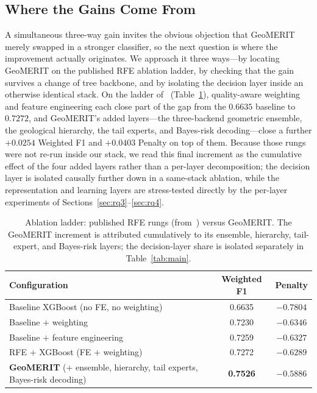\documentclass[bdcc,article,submit,pdftex,moreauthors]{Definitions/mdpi}
\begin{document}
\subsection{Where the Gains Come From}
\label{sec:rq2}
A simultaneous three-way gain invites the obvious objection that GeoMERIT merely swapped in a
stronger classifier, so the next question is where the improvement actually originates. We
approach it three ways---by locating GeoMERIT on the published RFE ablation ladder, by checking
that the gain survives a change of tree backbone, and by isolating the decision layer inside an
otherwise identical stack. On the ladder of~\cite{chen2026rfe} (Table~\ref{tab:ladder}),
quality-aware weighting and feature engineering each close part of the gap from the $0.6635$
baseline to $0.7272$, and GeoMERIT's added layers---the three-backend geometric ensemble, the
geological hierarchy, the tail experts, and Bayes-risk decoding---close a further $+0.0254$
Weighted F1 and $+0.0403$ Penalty on top of them. Because those rungs were not re-run inside
our stack, we read this final increment as the cumulative effect of the four added layers
rather than a per-layer decomposition; the decision layer is isolated causally further down in
a same-stack ablation, while the representation and learning layers are stress-tested directly
by the per-layer experiments of Sections~\ref{sec:rq3}--\ref{sec:rq4}.

\begin{table}[H]
\caption{Ablation ladder: published RFE rungs (from~\cite{chen2026rfe}) versus GeoMERIT. The
GeoMERIT increment is attributed cumulatively to its ensemble, hierarchy, tail-expert, and
Bayes-risk layers; the decision-layer share is isolated separately in
Table~\ref{tab:main}.\label{tab:ladder}}
\begin{tabularx}{\textwidth}{Xcc}
\toprule
\textbf{Configuration} & \textbf{Weighted F1} & \textbf{Penalty}\\
\midrule
Baseline XGBoost (no FE, no weighting) & 0.6635 & $-0.7804$\\
Baseline $+$ weighting & 0.7230 & $-0.6346$\\
Baseline $+$ feature engineering & 0.7259 & $-0.6327$\\
RFE $+$ XGBoost (FE $+$ weighting) & 0.7272 & $-0.6289$\\
\textbf{GeoMERIT} ($+$ ensemble, hierarchy, tail experts, Bayes-risk decoding) & \textbf{0.7526} & $\mathbf{-0.5886}$\\
\bottomrule
\end{tabularx}
\end{table}
\end{document}
